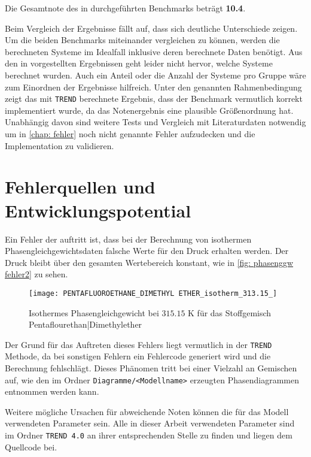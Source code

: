 \documentclass[../thesis.tex]{subfiles}
\begin{document}
Die Gesamtnote des in \cite{moine2021} durchgeführten Benchmarks beträgt \textbf{10.4}.

Beim Vergleich der Ergebnisse fällt auf, dass sich deutliche Unterschiede zeigen. Um die beiden Benchmarks miteinander vergleichen zu können, werden die berechneten Systeme im Idealfall inklusive deren berechnete Daten benötigt. Aus den in \cite{moine2021} vorgestellten Ergebnissen geht leider nicht hervor, welche Systeme berechnet wurden. Auch ein Anteil oder die Anzahl der Systeme pro Gruppe wäre zum Einordnen der Ergebnisse hilfreich. Unter den genannten Rahmenbedingung zeigt das mit \texttt{TREND} berechnete Ergebnis, dass der Benchmark vermutlich korrekt implementiert wurde, da das Notenergebnis eine plausible Größenordnung hat. Unabhängig davon sind weitere Tests und Vergleich mit Literaturdaten notwendig um in \autoref{chap: fehler} noch nicht genannte Fehler aufzudecken und die Implementation zu validieren.


\chapter{Fehlerquellen und Entwicklungspotential}
\label{chap: fehler}

Ein Fehler der auftritt ist, dass bei der Berechnung von isothermen Phasengleichgewichtsdaten falsche Werte für den Druck erhalten werden. Der Druck bleibt über den gesamten Wertebereich konstant, wie in \autoref{fig: phasenggw fehler2} zu sehen.

\begin{figure}[htb]
	\centering
	\texttt{[image: PENTAFLUOROETHANE\_DIMETHYL ETHER\_isotherm\_313.15\_]}
	\caption{Isothermes Phasengleichgewicht bei $ 315$.$15$ K für das Stoffgemisch Pentaflourethan|Dimethylether}
	\label{fig: phasenggw fehler2}
\end{figure}
Der Grund für das Auftreten dieses Fehlers liegt vermutlich in der \texttt{TREND} Methode, da bei sonstigen Fehlern ein Fehlercode generiert wird und die Berechnung fehlschlägt. Dieses Phänomen tritt bei einer Vielzahl an Gemischen auf, wie den im Ordner \newline \texttt{Diagramme/<Modellname>} erzeugten Phasendiagrammen  entnommen werden kann.

Weitere mögliche Ursachen für abweichende Noten können die für das Modell verwendeten Parameter sein. Alle in dieser Arbeit verwendeten Parameter sind im Ordner \texttt{TREND 4.0} an ihrer entsprechenden Stelle zu finden und liegen dem Quellcode bei.
\end{document}

